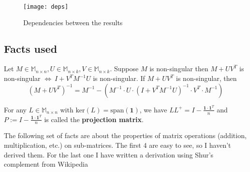 \begin{figure}[h!]

\begin{center}
\texttt{[image: deps]} 
\end{center}
\caption{Dependencies between the results}
 
\end{figure}

\subsection{Facts used}

\begin{HXf}
 Let $ M \in \mathbb{M}_{n \times n} , U \in \mathbb{M}_{n \times k}, V \in \mathbb{M}_{n \times k}$. Suppose $M$ is non-singular then $M + UV^T$ is non-singular $\iff \ I + V^T M^{-1} U$ is non-singular. If $M + UV^T$ is non-singular, then 
 $$ (M + UV^T)^{-1} = M^{-1} - \left( M^{-1} \cdot U \cdot (I + V^TM^{-1}U)^{-1} \cdot V^T \cdot M^{-1}\right) $$
\end{HXf}


\begin{HXf}
 For any $L \in \mathbb{M}_{n \times n}$ with $\text{ker}(L) = \text{span}(\textbf{1})$, we have $LL^+ = I - \frac{\textbf{1} \cdot \textbf{1}^T}{n}$ and $P := I - \frac{\textbf{1} \cdot \textbf{1}^T}{n}$ is called the \textbf{projection matrix}. 
\end{HXf}

The following set of facts are about the properties of matrix operations (addition, multiplication, etc.) on sub-matrices. The first 4 are easy to see, so I haven't derived them. For the last one I have written a derivation using Shur's complement from Wikipedia

